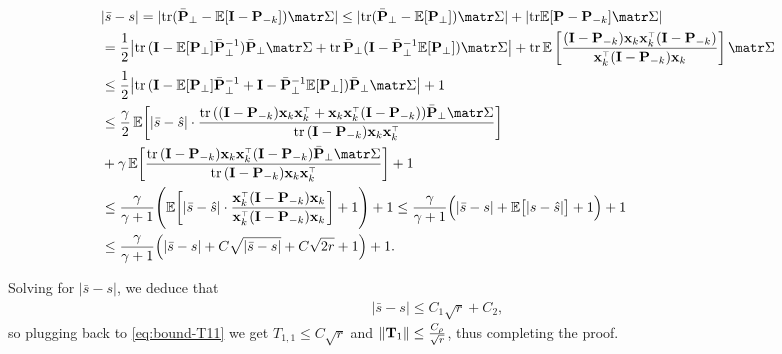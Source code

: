 \documentclass[../../thesis.tex]{subfiles}
\begin{document}
\begin{align*}
   & |\bar s - s|  = |\tr (\bar \P_\perp - \E[\I - \P_{-k}] )\Sigmab|   \le |\tr (\bar \P_\perp - \E[\P_\perp] )\Sigmab|   + |\tr \E[\P - \P_{-k}] \Sigmab|                                                                                                                \\
   & = \frac12 \big|\tr\,(\I-\E[\P_\perp]\bar\P_\perp^{-1})\bar\P_\perp\Sigmab + \tr\,\bar\P_\perp (\I - \bar \P_\perp^{-1} \E[\P_\perp]) \Sigmab \big|   + \tr\,\E \left[ \frac{(\I - \P_{-k})\x_k\x_k^\top(\I - \P_{-k})}{\x_k^\top (\I - \P_{-k}) \x_k} \right] \Sigmab \\
   & \leq \frac12 \big|\tr\,(\I-\E[\P_\perp]\bar\P_\perp^{-1} + \I - \bar \P_\perp^{-1} \E[\P_\perp])\bar\P_\perp\Sigmab \big|   + 1                                                                                                                                       \\
   & \leq \frac{\gamma}2 \,\E\bigg[|\bar s-\hat s|\cdot
  \frac{\tr\,( (\I -\P_{-k})\x_k\x_k^\top + \x_k\x_k^\top (\I -\P_{-k})) \bar\P_\perp\Sigmab}{\tr\,(\I -\P_{-k})\x_k\x_k^\top}  \bigg]                                                                                                                                     \\
   & + \gamma\, \E\bigg[\frac{\tr\,(\I-\P_{-k})\x_k\x_k^\top(\I-\P_{-k})\bar\P_\perp\Sigmab}
  {\tr\,(\I-\P_{-k})\x_k\x_k^\top}\bigg] + 1                                                                                                                                                                                                                               \\
   & \leq \frac{\gamma}{\gamma+1}\Bigg(\E\bigg[|\bar s-\hat
    s| \cdot \frac{\x_k^\top (\I -\P_{-k}) \x_k}{\x_k^\top (\I -\P_{-k}) \x_k}  \bigg] + 1\Bigg) + 1\leq \frac{\gamma}{\gamma+1}\Big(|\bar
  s-s| + \E\big[|s-\hat s|\big] + 1\Big) + 1                                                                                                                                                                                                                               \\
   & \leq \frac{\gamma}{\gamma+1}\Big(|\bar s- s| +
  C\sqrt{|\bar s- s|} + C\sqrt{2 r} + 1\Big) + 1.
\end{align*}

Solving for $|\bar s-s|$, we deduce that
\begin{align*}
  |\bar s-s| \leq C_1 \sqrt{r} + C_2,
\end{align*}
so plugging back to \eqref{eq:bound-T11} we get $T_{1,1} \le C
  \sqrt r$ and $\| \mathbf{T}_1\| \le \frac{C_\rho}{\sqrt r} $, thus completing
the proof.
\end{document}
